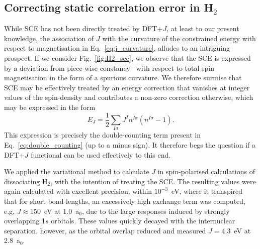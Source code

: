 \subsection{Correcting static correlation error in H$_2$}

{
While SCE has not been directly treated by DFT+$J$, 
at least to our present knowledge, 
the association of $J$ with 
the curvature of the constrained energy 
with respect to magnetisation 
in Eq.~\eqref{eq:j_curvature},  
alludes to an intriguing prospect.}
%
If we consider Fig.~\ref{fig:H2_sce}, 
we observe that the SCE is expressed  
by a deviation from piece-wise constancy~\cite{doi:10.1063/1.2987202} 
with respect to total spin magnetisation 
in the form of a spurious curvature.
% 
{
We therefore surmise that SCE 
may be effectively treated 
by an energy correction
that vanishes at integer values 
of the spin-density and 
contributes a non-zero correction otherwise, 
which may be expressed in the form}
%
\begin{equation}
E_J=\frac{1}{2}\sum_{I\sigma}J^In^{I\sigma}(n^{I\sigma}-1).
\end{equation} 
%
This expression is precisely the 
double-counting term present 
in Eq.~\eqref{eq:double_counting} 
(up to a minus sign).
%
It therefore begs the question 
if a DFT+$J$ functional can be used effectively to this end.

We applied the variational method 
to calculate $J$ in spin-polarised calculations 
of dissociating H$_2$, 
with the intention of treating the SCE.
%
{
The resulting values were again 
calculated with excellent precision, 
within $10^{-3}$~eV}, 
where it transpired that for short bond-lengths, 
an excessively high exchange term was computed, 
e.g, 
$J\approx$150~eV at 1.0~a$_0$, 
due to the large responses induced 
by strongly overlapping 1$s$ orbitals.
%
These values quickly decayed with 
the internuclear separation, however, 
as the orbital overlap reduced 
and measured $J=4.3$~eV at 2.8~a$_0$.
%

